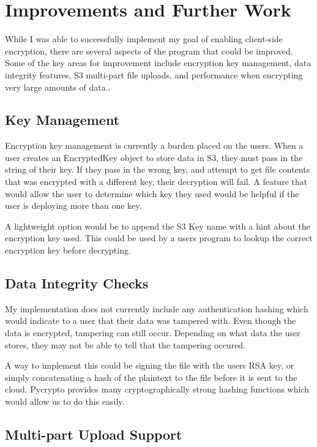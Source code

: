 \section{Improvements and Further Work}

While I was able to successfully implement my goal of enabling client-side encryption, there are several aspects
of the program that could be improved. Some of the key areas for improvement include encryption key management,
data integrity features, S3 multi-part file uploads, and performance when encrypting very large amounts of data..

\subsection{Key Management}
Encryption key management is currently a burden placed on the users. When a user creates an EncryptedKey object to store data in S3, they must pass in the string of their key. If they pass in the wrong key, and attempt to get file contents that was encrypted with a different key, their decryption will fail. A feature that would allow the user to determine which key they used would be helpful if the user is deploying more than one key.

A lightweight option would be to append the S3 Key name with a hint about the encryption key used. This could be used 
by a users program to lookup the correct encryption key before decrypting. 

\subsection{Data Integrity Checks}
My implementation does not currently include any authentication hashing which would indicate to a user that their data was tampered with.
Even though the data is encrypted, tampering can still occur. Depending on what data the user stores, they may not be able to tell that
the tampering occured.

A way to implement this could be signing the file with the users RSA key, or simply concatenating a hash of the plaintext to the file before it is sent to the cloud. Pycrypto provides many cryptographically strong hashing functions which would allow us to do this easily.

\subsection{Multi-part Upload Support}


